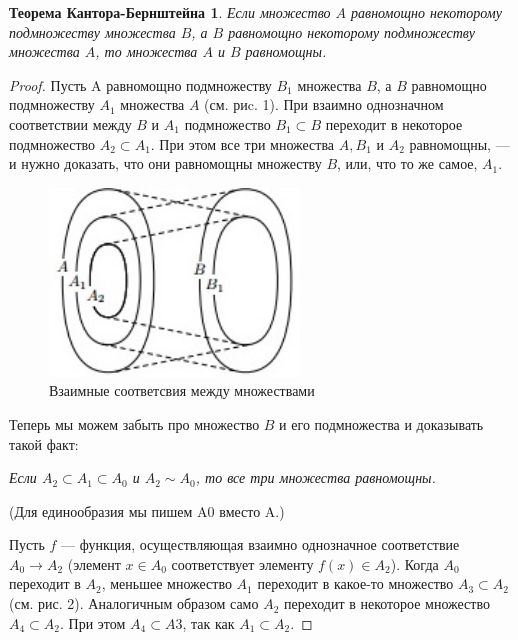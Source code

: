 \documentclass[a4paper, 12pt]{article}
\newtheorem*{cantorbern}{Теорема Кантора-Бернштейна}
\begin{document}
\begin{cantorbern}
    Если множество $A$ равномощно некоторому подмножеству множества $B$, а $B$ равномощно некоторому подмножеству множества $A$, то множества $A$ и $B$ равномощны.
\end{cantorbern}

\begin{proof}
 
 
 Пусть A равномощно подмножеству $B_1$ множества $B$, а $B$ равномощно подмножеству $A_1$ множества $A$ (см. риc. 1). При взаимно однозначном соответствии между $B$ и $A_1$ подмножество $B_1 \subset B$ переходит в некоторое подмножество $A_2 \subset A_1$. При этом все три множества $A, B_1$ и $A_2$ равномощны, --- и нужно доказать, что они равномощны множеству $B$, или, что то же самое, $A_1$.
 
 \begin{figure}[h]
\begin{center}
\begin{minipage}[h]{0.4\linewidth}
 \includegraphics[height=5cm, width=\linewidth]{images/kantorbern1.jpg}
 \caption{Взаимные соответсвия между множествами}
 \end{minipage}
 \end{center}
 \end{figure}
 
 Теперь мы можем забыть про множество $B$ и его подмножества и доказывать такой факт:
 
 \textit{Если $A_2 \subset A_1 \subset A_0$ и $A_2 \sim A_0$, то все три множества
равномощны.}

 (Для единообразия мы пишем A0 вместо A.)
 
 Пусть $f$ — функция, осуществляющая взаимно однозначное соответствие $A_0 \rightarrow A_2$ (элемент $x \in A_0$ соответствует элементу $f(x) \in A_2$). Когда $A_0$ переходит в $A_2$, меньшее множество $A_1$ переходит в какое-то множество $A_3 \subset A_2$ (см. рис. 2). Аналогичным образом само $A_2$ переходит в некоторое множество $A_4 \subset A_2$. При этом $A_4 \subset A3$, так как $A_1 \subset A_2$.


\end{proof}
\end{document}
